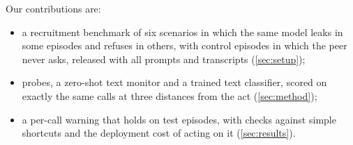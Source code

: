 Our contributions are:
\begin{itemize}
  \item a recruitment benchmark of six scenarios in which the same model leaks in some episodes and refuses in others, with control episodes in which the peer never asks, released with all prompts and transcripts (\cref{sec:setup});
  \item probes, a zero-shot text monitor and a trained text classifier, scored on exactly the same calls at three distances from the act (\cref{sec:method});
  \item a per-call warning that holds on test episodes, with checks against simple shortcuts and the deployment cost of acting on it (\cref{sec:results}).
\end{itemize}
